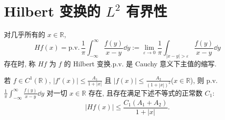 \section{\texorpdfstring{Hilbert 变换的 $L^2$ 有界性}{Hilbert 变换的 L2 有界性}}\label{sec:1.3}


\begin{definition}\label{def:1.3.1}
对几乎所有的 $x \in \mathbb{R}$, 
\begin{equation*}
Hf(x) = \mathrm{p.v.}\,\frac{1}{\pi}\int_{-\infty}^{\infty}\frac{f(y)}{x - y}\dd y := \lim_{\varepsilon \to 0}\frac{1}{\pi}\int_{|x - y| > \varepsilon}\frac{f(y)}{x - y}\dd y
\end{equation*}
存在时, 称 $Hf$ 为 $f$ 的 Hilbert 变换.p.v. 是 Cauchy 意义下主值的缩写.
\end{definition}

\begin{lemma}\label{lem:1.3.2}
若 $f \in C^{1}(\mathbb{R})$, $|f'(x)| \leq \frac{A_{1}}{1 + |x|}$ 且 $|f(x)| \leq \frac{A_{2}}{(1 + |x|)^{2}}$($x \in \mathbb{R}$), 则 p.v. $\frac{1}{\pi}\int_{-\infty}^{\infty}\frac{f(y)}{x - y}\dd y$ 对一切 $x \in \mathbb{R}$ 存在, 且存在满足下述不等式的正常数 $C_{1}$:
\begin{equation*}
|Hf(x)| \leq \frac{C_{1}(A_{1} + A_{2})}{1 + |x|}.
\end{equation*}
\end{lemma}

